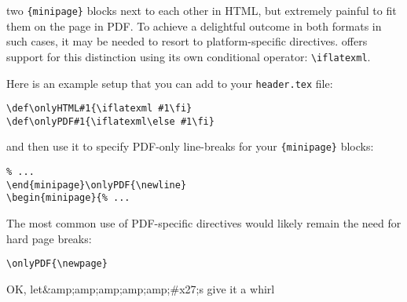 two \verb|{minipage}| blocks next to each other in HTML, but extremely painful to fit them on the page in PDF. To achieve a delightful outcome in both formats in such cases, it may be needed to resort to platform-specific directives. \latexml offers support for this distinction using its own conditional operator: \verb|\iflatexml|.

Here is an example setup that you can add to your \verb|header.tex| file:
\begin{lstlisting}
\def\onlyHTML#1{\iflatexml #1\fi}
\def\onlyPDF#1{\iflatexml\else #1\fi}
\end{lstlisting}

and then use it to specify PDF-only line-breaks for your \verb|{minipage}| blocks:
\begin{lstlisting}
% ...
\end{minipage}\onlyPDF{\newline}
\begin{minipage}{% ...
\end{lstlisting}

The most common use of PDF-specific directives would likely remain the need for hard page breaks:
\begin{lstlisting}
\onlyPDF{\newpage}
\end{lstlisting} OK, let&amp;amp;amp;amp;amp;#x27;s give it a whirl
